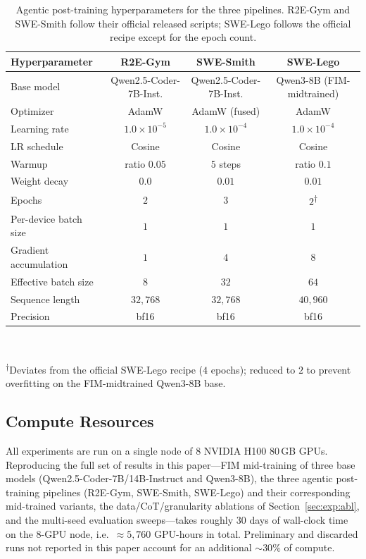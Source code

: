 \begin{table}[h]
\centering
\footnotesize
\caption{Agentic post-training hyperparameters for the three pipelines.
R2E-Gym and SWE-Smith follow their official released scripts; SWE-Lego
follows the official recipe except for the epoch count.}
\label{tab:hp-posttrain}
\setlength{\tabcolsep}{6pt}
\begin{tabular}{lccc}
\toprule
\textbf{Hyperparameter} & \textbf{R2E-Gym} & \textbf{SWE-Smith} & \textbf{SWE-Lego} \\
\midrule
Base model            & Qwen2.5-Coder-7B-Inst.
                      & Qwen2.5-Coder-7B-Inst.
                      & Qwen3-8B (FIM-midtrained) \\
Optimizer             & AdamW & AdamW (fused) & AdamW \\
Learning rate         & $1.0\!\times\!10^{-5}$
                      & $1.0\!\times\!10^{-4}$
                      & $1.0\!\times\!10^{-4}$ \\
LR schedule           & Cosine & Cosine & Cosine \\
Warmup                & ratio $0.05$ & $5$ steps & ratio $0.1$ \\
Weight decay          & $0.0$ & $0.01$ & $0.01$ \\
Epochs                & $2$ & $3$ & $2$\textsuperscript{$\dagger$} \\
Per-device batch size & $1$ & $1$ & $1$ \\
Gradient accumulation & $1$ & $4$ & $8$ \\
Effective batch size  & $8$ & $32$ & $64$ \\
Sequence length       & $32{,}768$ & $32{,}768$ & $40{,}960$ \\
Precision             & bf16 & bf16 & bf16 \\
\bottomrule
\end{tabular}
\\[0.3em]
{\raggedright \footnotesize \textsuperscript{$\dagger$}Deviates from the
official SWE-Lego recipe ($4$ epochs); reduced to $2$ to prevent
overfitting on the FIM-midtrained Qwen3-8B base.\par}
\end{table}

\subsection{Compute Resources}
\label{app:hp:compute}
All experiments are run on a single node of $8$ NVIDIA H100 80\,GB GPUs.
Reproducing the full set of results in this paper---FIM mid-training
of three base models (Qwen2.5-Coder-7B/14B-Instruct and Qwen3-8B), the
three agentic post-training pipelines (R2E-Gym, SWE-Smith, SWE-Lego)
and their corresponding mid-trained variants, the data/CoT/granularity
ablations of Section~\ref{sec:exp:abl}, and the multi-seed evaluation
sweeps---takes roughly $30$ days of wall-clock time on the $8$-GPU node,
i.e.\ $\approx\!5{,}760$ GPU-hours in total. Preliminary and discarded
runs not reported in this paper account for an additional ${\sim}30\%$
of compute.

